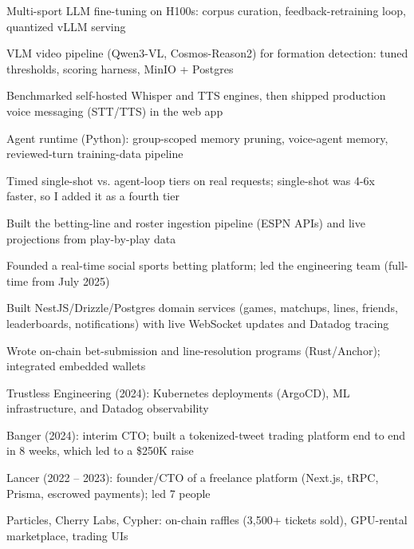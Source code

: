 \documentclass[print]{jack-resume}
\begin{document}
\begin{tightemize}
    \item Multi-sport LLM fine-tuning on H100s: corpus curation, feedback-retraining loop, quantized vLLM serving
    \item VLM video pipeline (Qwen3-VL, Cosmos-Reason2) for formation detection: tuned thresholds, scoring harness, MinIO + Postgres
    \item Benchmarked self-hosted Whisper and TTS engines, then shipped production voice messaging (STT/TTS) in the web app
    \item Agent runtime (Python): group-scoped memory pruning, voice-agent memory, reviewed-turn training-data pipeline
    \item Timed single-shot vs. agent-loop tiers on real requests; single-shot was 4-6x faster, so I added it as a fourth tier
\end{tightemize}
\sectionsep

\begin{tightemize}
    \item Built the betting-line and roster ingestion pipeline (ESPN APIs) and live projections from play-by-play data
    \item Founded a real-time social sports betting platform; led the engineering team (full-time from July 2025)
    \item Built NestJS/Drizzle/Postgres domain services (games, matchups, lines, friends, leaderboards, notifications) with live WebSocket updates and Datadog tracing
    \item Wrote on-chain bet-submission and line-resolution programs (Rust/Anchor); integrated embedded wallets
\end{tightemize}
\sectionsep

\begin{tightemize}
    \item Trustless Engineering (2024): Kubernetes deployments (ArgoCD), ML infrastructure, and Datadog observability
    \item Banger (2024): interim CTO; built a tokenized-tweet trading platform end to end in 8 weeks, which led to a \$250K raise
    \item Lancer (2022 -- 2023): founder/CTO of a freelance platform (Next.js, tRPC, Prisma, escrowed payments); led 7 people
    \item Particles, Cherry Labs, Cypher: on-chain raffles (3,500+ tickets sold), GPU-rental marketplace, trading UIs
\end{tightemize}
\sectionsep
\end{document}
